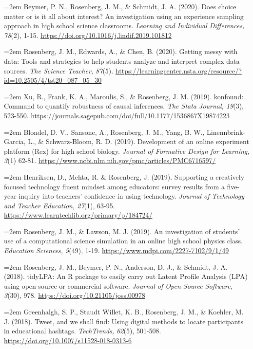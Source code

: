 \documentclass[
  14,
]{article}
\begin{document}
\hangindent=2em Beymer, P. N., Rosenberg, J. M., \& Schmidt, J. A.
(2020). Does choice matter or is it all about interest? An investigation
using an experience sampling approach in high school science classrooms.
\emph{Learning and Individual Differences, 78}(2), 1-15.
\url{https://doi.org/10.1016/j.lindif.2019.101812}

\hangindent=2em Rosenberg, J. M., Edwards, A., \& Chen, B. (2020).
Getting messy with data: Tools and strategies to help students analyze
and interpret complex data sources. \emph{The Science Teacher, 87}(5).
\url{https://learningcenter.nsta.org/resource/?id=10.2505/4/tst20_087_05_30}

\hangindent=2em Xu, R., Frank, K. A., Maroulis, S., \& Rosenberg, J. M.
(2019). konfound: Command to quantify robustness of causal inferences.
\emph{The Stata Journal, 19}(3), 523-550.
\url{https://journals.sagepub.com/doi/full/10.1177/1536867X19874223}

\hangindent=2em Blondel, D. V., Sansone, A., Rosenberg, J. M., Yang, B.
W., Linennbrink-Garcia, L., \& Schwarz-Bloom, R. D. (2019). Development
of an online experiment platform (Rex) for high school biology.
\emph{Journal of Formative Design for Learning, 3}(1) 62-81.
\url{https://www.ncbi.nlm.nih.gov/pmc/articles/PMC6716597/}

\hangindent=2em Henriksen, D., Mehta, R. \& Rosenberg, J. (2019).
Supporting a creatively focused technology fluent mindset among
educators: survey results from a five-year inquiry into teachers'
confidence in using technology. \emph{Journal of Technology and Teacher
Education, 27}(1), 63-95.
\url{https://www.learntechlib.org/primary/p/184724/}

\hangindent=2em Rosenberg, J. M., \& Lawson, M. J. (2019). An
investigation of students' use of a computational science simulation in
an online high school physics class. \emph{Education Sciences, 9}(49),
1-19. \url{https://www.mdpi.com/2227-7102/9/1/49}

\hangindent=2em Rosenberg, J. M., Beymer, P. N., Anderson, D. J., \&
Schmidt, J. A. (2018). tidyLPA: An R package to easily carry out Latent
Profile Analysis (LPA) using open-source or commercial software.
\emph{Journal of Open Source Software, 3}(30), 978.
\url{https://doi.org/10.21105/joss.00978}

\hangindent=2em Greenhalgh, S. P., Staudt Willet, K. B., Rosenberg, J.
M., \& Koehler, M. J. (2018). Tweet, and we shall find: Using digital
methods to locate participants in educational hashtags.
\emph{TechTrends, 62}(5), 501-508.
\url{https://doi.org/10.1007/s11528-018-0313-6}
\end{document}
